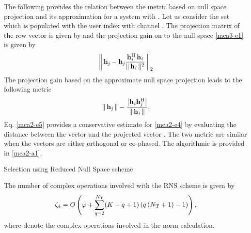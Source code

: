 The following provides the relation between the metric based on null space projection and its approximation for a system with . Let us consider the set  which is populated with the user index  with channel . The projection matrix of the row vector  is given by  and the projection gain on to the null space \eqref{mca3-e1} is given by
\begin{equation}
\left \| \, \mvecxy{h}{j} - \mvecxy{h}{j} \frac{\mvecxy{h}{i}^\mrm{H} \, \mvecxy{h}{i}}{\gnorm{\mvecxy{h}{i}}^2} \, \right \|_2
\label{mca2-e4}
\end{equation}
The projection gain based on the approximate null space projection leads to the following metric
\begin{equation}
\gnorm{\mvecxy{h}{j}} - \frac{\left | \mvecxy{h}{i} \mvecxy{h}{j}^\mrm{H} \right |}{\gnorm{\mvecxy{h}{i}}}.
\label{mca2-e5}
\end{equation}
Eq. \eqref{mca2-e5} provides a conservative estimate for \eqref{mca2-e4} by evaluating the distance between the vector  and the projected vector . The two metric are similar when the vectors are either orthogonal or co-phased. The algorithmic is provided in \ref{mca2-a1}.
\begin{algorithm}
 \SetAlgoLined
 \DontPrintSemicolon
 \caption{Selection using Reduced Null Space scheme}
 \label{mca2-a1}
\end{algorithm}

The number of complex operations involved with the \ac{RNS} scheme is given by
\begin{eqnarray*}
\zeta_4 = O \left ( \varphi + \sum^{N_{\mathrm{T}}}_{q = 2} (K - q + 1) \, (q \, (N_{\mathrm{T}} + 1) - 1) \right ),
\end{eqnarray*}
where  denote the complex operations involved in the norm calculation.
